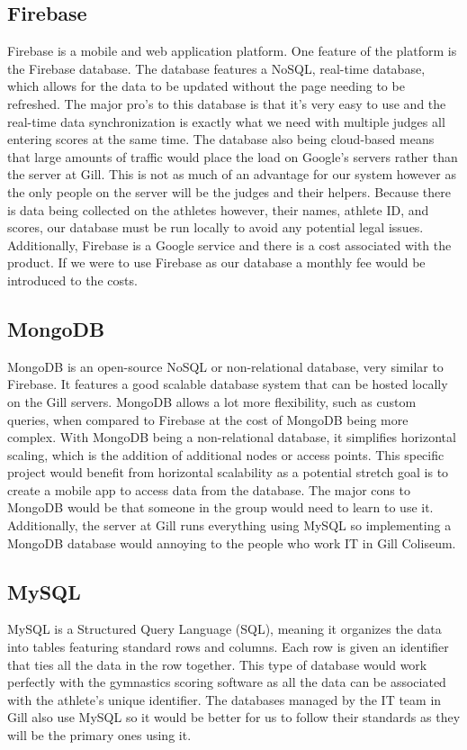 \documentclass[letterpaper,10pt,draftclsnofoot,onecolumn,]{article}
\begin{document}
\subsection*{Firebase}
Firebase is a mobile and web application platform. One feature of the platform is the Firebase database. The database features a NoSQL, real-time database, which allows for the data to be updated without the page needing to be refreshed.\cite{khedkar} The major pro’s to this database is that it’s very easy to use and the real-time data synchronization is exactly what we need with multiple judges all entering scores at the same time. The database also being cloud-based means that large amounts of traffic would place the load on Google’s servers rather than the server at Gill. This is not as much of an advantage for our system however as the only people on the server will be the judges and their helpers.
Because there is data being collected on the athletes however, their names, athlete ID, and scores, our database must be run locally to avoid any potential legal issues. Additionally, Firebase is a Google service and there is a cost associated with the product.  If we were to use Firebase as our database a monthly fee would be introduced to the costs. 
\subsection*{MongoDB}
MongoDB is an open-source NoSQL or non-relational database, very similar to Firebase.  It features a good scalable database system that can be hosted locally on the Gill servers. MongoDB allows a lot more flexibility, such as custom queries,  when compared to Firebase at the cost of MongoDB being more complex.\cite{youtube} With MongoDB being a non-relational database, it simplifies horizontal scaling, which is the addition of additional nodes or access points. This specific project would benefit from horizontal scalability as a potential stretch goal is to create a mobile app to access data from the database. The major cons to MongoDB would be that someone in the group would need to learn to use it. Additionally, the server at Gill runs everything using MySQL so implementing a MongoDB database would annoying to the people who work IT in Gill Coliseum. 
\subsection*{MySQL}
MySQL is a Structured Query Language (SQL), meaning it organizes the data into tables featuring standard rows and columns.\cite{dbengines} Each row is given an identifier that ties all the data in the row together. This type of database would work perfectly with the gymnastics scoring software as all the data can be associated with the athlete’s unique identifier. The databases managed by the IT team in Gill also use MySQL so it would be better for us to follow their standards as they will be the primary ones using it.
\end{document}
